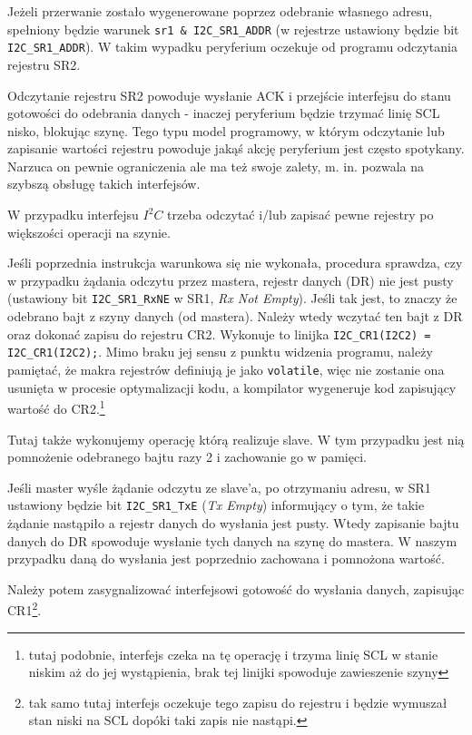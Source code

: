 \documentclass{pdfBooklets}
\begin{document}
Jeżeli przerwanie zostało wygenerowane poprzez odebranie własnego adresu, spełniony będzie warunek \Verb$sr1 & I2C_SR1_ADDR$ (w rejestrze ustawiony
będzie bit \Verb$I2C_SR1_ADDR$). W takim wypadku peryferium oczekuje od programu odczytania rejestru SR2.

\begin{ProTip}{}
Odczytanie rejestru SR2 powoduje wysłanie ACK i przejście interfejsu do stanu gotowości do odebrania danych - inaczej peryferium będzie
trzymać linię SCL nisko, blokując szynę. Tego typu model programowy, w którym odczytanie lub zapisanie wartości rejestru powoduje
jakąś akcję peryferium jest często spotykany. Narzuca on pewnie ograniczenia ale ma też swoje zalety, m. in. pozwala na szybszą obsługę takich
interfejsów.

W przypadku interfejsu $I^2C$ trzeba odczytać i/lub zapisać pewne rejestry po większości operacji na szynie.
\end{ProTip}

Jeśli poprzednia instrukcja warunkowa się nie wykonała, procedura sprawdza, czy w przypadku żądania odczytu przez mastera, rejestr danych (DR) nie jest pusty (ustawiony bit \Verb$I2C_SR1_RxNE$
w SR1, \textit{Rx Not Empty}). Jeśli tak jest, to znaczy że odebrano bajt z szyny danych (od mastera). Należy wtedy wczytać ten bajt z DR oraz dokonać zapisu do rejestru
CR2. Wykonuje to linijka \Verb$I2C_CR1(I2C2) = I2C_CR1(I2C2);$. Mimo braku jej sensu z punktu widzenia programu, należy pamiętać, że makra rejestrów
definiują je jako \texttt{volatile}, więc nie zostanie ona usunięta w procesie optymalizacji kodu, a kompilator wygeneruje kod zapisujący wartość
do CR2.\footnote{tutaj podobnie, interfejs czeka na tę operację i trzyma linię SCL w stanie niskim aż do jej wystąpienia, brak tej linijki spowoduje
  zawieszenie szyny}

Tutaj także wykonujemy operację którą realizuje slave. W tym przypadku jest nią pomnożenie odebranego bajtu razy 2 i zachowanie go w pamięci.

Jeśli master wyśle żądanie odczytu ze slave'a, po otrzymaniu adresu, w SR1 ustawiony będzie bit \Verb$I2C_SR1_TxE$ (\textit{Tx Empty}) informujący
o tym, że takie żądanie nastąpiło a rejestr danych do wysłania jest pusty. Wtedy zapisanie bajtu danych do DR spowoduje wysłanie tych danych na szynę
do mastera. W naszym przypadku daną do wysłania jest poprzednio zachowana i pomnożona wartość.

Należy potem zasygnalizować interfejsowi gotowość do wysłania danych, zapisując CR1\footnote{tak samo tutaj interfejs oczekuje tego zapisu do rejestru i będzie wymuszał stan niski na SCL dopóki taki zapis nie nastąpi. }.\\
\end{document}
